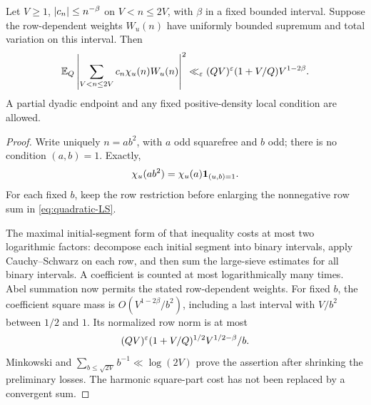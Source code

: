 \begin{lemma}\label{lem:full-column-LS}
Let $V\ge1$, $\lvert c_n\rvert\le n^{-\beta}$ on $V<n\le2V$, with $\beta$ in a fixed bounded interval. Suppose the row-dependent weights $W_u(n)$ have uniformly bounded supremum and total variation on this interval. Then
\begin{equation}\label{eq:full-column-LS}
 \mathbb E_Q\left|\sum_{V<n\le2V}c_n\chi_u(n)W_u(n)\right|^2
 \ll_\varepsilon (QV)^\varepsilon(1+V/Q)V^{1-2\beta}.
\end{equation}
A partial dyadic endpoint and any fixed positive-density local condition are allowed.
\end{lemma}
\begin{proof}
Write uniquely $n=ab^2$, with $a$ odd squarefree and $b$ odd; there is no condition $(a,b)=1$. Exactly,
\[
 \chi_u(ab^2)=\chi_u(a)\mathbf 1_{(u,b)=1}.
\]
For each fixed $b$, keep the row restriction before enlarging the nonnegative row sum in \eqref{eq:quadratic-LS}.

The maximal initial-segment form of that inequality costs at most two logarithmic factors: decompose each initial segment into binary intervals, apply Cauchy--Schwarz on each row, and then sum the large-sieve estimates for all binary intervals. A coefficient is counted at most logarithmically many times. Abel summation now permits the stated row-dependent weights. For fixed $b$, the coefficient square mass is $O(V^{1-2\beta}/b^2)$, including a last interval with $V/b^2$ between $1/2$ and $1$. Its normalized row norm is at most
\[
 (QV)^\varepsilon(1+V/Q)^{1/2}V^{1/2-\beta}/b.
\]
Minkowski and $\sum_{b\le\sqrt{2V}}b^{-1}\ll\log(2V)$ prove the assertion after shrinking the preliminary losses. The harmonic square-part cost has not been replaced by a convergent sum.
\end{proof}

